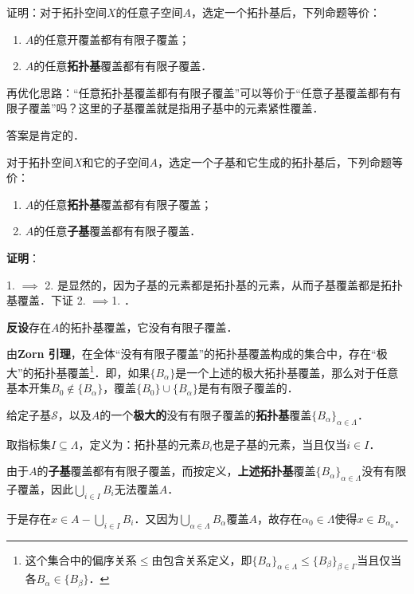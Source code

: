 \begin{exercise}{}\label{TychT_exe1}
证明：对于拓扑空间$X$的任意子空间$A$，选定一个拓扑基后，下列命题等价：
\begin{enumerate}
\item $A$的任意开覆盖都有有限子覆盖；
\item $A$的任意\textbf{拓扑基}覆盖都有有限子覆盖．
\end{enumerate}
\end{exercise}

再优化思路：“任意拓扑基覆盖都有有限子覆盖”可以等价于“任意子基覆盖都有有限子覆盖”吗？这里的子基覆盖就是指用子基中的元素紧性覆盖．

答案是肯定的．

\begin{theorem}{}\label{TychT_the1}
对于拓扑空间$X$和它的子空间$A$，选定一个子基和它生成的拓扑基后，下列命题等价：
\begin{enumerate}
\item $A$的任意\textbf{拓扑基}覆盖都有有限子覆盖；
\item $A$的任意\textbf{子基}覆盖都有有限子覆盖．
\end{enumerate}
\end{theorem}

\textbf{证明}：

1. $\implies$ 2. 是显然的，因为子基的元素都是拓扑基的元素，从而子基覆盖都是拓扑基覆盖．下证 2. $\implies$1. ．

\textbf{反设}存在$A$的拓扑基覆盖，它没有有限子覆盖．

由\textbf{Zorn 引理}，在全体“没有有限子覆盖”的拓扑基覆盖构成的集合中，存在“极大”的拓扑基覆盖\footnote{这个集合中的偏序关系$\leq$由包含关系定义，即$\{B_\alpha\}_{\alpha\in \Lambda}\leq\{B_\beta\}_{\beta\in \Gamma}$当且仅当各$B_\alpha\in\{B_\beta\}$．}．即，如果$\{B_\alpha\}$是一个上述的极大拓扑基覆盖，那么对于任意基本开集$B_0\not\in\{B_\alpha\}$，覆盖$\{B_0\}\cup\{B_\alpha\}$是有有限子覆盖的．

给定子基$\mathcal{S}$，以及$A$的一个\textbf{极大的}没有有限子覆盖的\textbf{拓扑基}覆盖$\{B_\alpha\}_{\alpha\in \Lambda}$．

取指标集$I\subseteq \Lambda$，定义为：拓扑基的元素$B_i$也是子基的元素，当且仅当$i\in I$．

由于$A$的\textbf{子基}覆盖都有有限子覆盖，而按定义，\textbf{上述拓扑基}覆盖$\{B_\alpha\}_{\alpha\in \Lambda}$没有有限子覆盖，因此$\bigcup_{i\in I} B_i$无法覆盖$A$．

于是存在$x\in A-\bigcup_{i\in I} B_i$．又因为$\bigcup_{\alpha\in \Lambda}B_\alpha$覆盖$A$，故存在$\alpha_0\in\Lambda$使得$x\in B_{\alpha_0}$．

